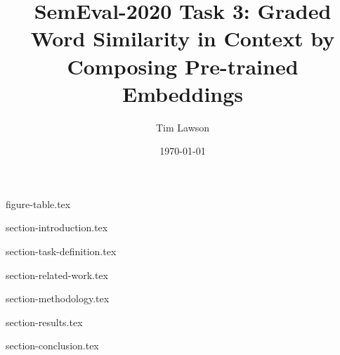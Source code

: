 \documentclass[11pt]{extarticle}
\begin{document}
\title{SemEval-2020 Task 3: Graded Word Similarity in Context by Composing Pre-trained Embeddings}
\author{Tim Lawson}
\date{\today}

\maketitle

{figure-table.tex}

{section-introduction.tex}

{section-task-definition.tex}

{section-related-work.tex}

{section-methodology.tex}

{section-results.tex}

{section-conclusion.tex}

\printbibliography
\end{document}
